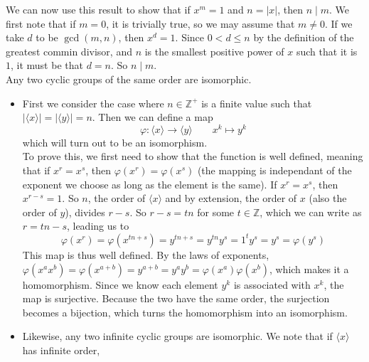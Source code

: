 \documentclass[12pt]{article}
\newcommand{\Z}{\mathbb{Z}}
\newcommand{\ang}[1]{\langle #1 \rangle}
\begin{document}
    We can now use this result to show that
    if $x^m = 1$ and $n = |x|$, then $n \mid m$.
    We first note that if $m = 0$, it is trivially true,
    so we may assume that $m \neq 0$. 
    If we take $d$ to be $\gcd(m, n)$,
    then $x^d = 1$.
    Since $0 < d \leqslant n$
    by the definition of the greatest commin divisor,
    and $n$ is the smallest positive power of $x$ such that it is $1$,
    it must be that $d = n$. So $n \mid m$. \\
    
    Any two cyclic groups of the same order are isomorphic.
    \begin{itemize}[label=$\diamond$]
        \item 
            First we consider the case where
            $n \in \Z^+$ is a finite value
            such that $|\ang{x}| = |\ang{y}| = n$.
            Then we can define a map
            \[ \varphi: \ang{x} \to \ang{y} \qquad x^k \mapsto y^k \]
            which will turn out to be an isomorphism. \\
            To prove this,
            we first need to show that the function is well defined,
            meaning that if $x^r = x^s$,
            then $\varphi(x^r) = \varphi(x^s)$
            (the mapping is independant of the exponent we choose
            as long as the element is the same).
            If $x^r = x^s$, then $x^{r-s} = 1$.
            So $n$, the order of $\ang{x}$ and by extension,
            the order of $x$ (also the order of $y$),
            divides $r - s$.
            So $r-s = tn$ for some $t \in \Z$,
            which we can write as $r = tn - s$,
            leading us to
            \[
                \varphi(x^r) = \varphi(x^{tn + s})
                = y^{tn + s}
                = y^{tn}y^{s}
                = 1^ty^s
                = y^s
                = \varphi(y^s)
            \]
            This map is thus well defined.
            By the laws of exponents,
            $\varphi(x^ax^b) = \varphi(x^{a+b})
            = y^{a+b} = y^ay^b = \varphi(x^a)\varphi(x^b)$,
            which makes it a homomorphism. 
            Since we know each element $y^k$
            is associated with $x^k$,
            the map is surjective.
            Because the two have the same order,
            the surjection becomes a bijection,
            which turns the homomorphism into an isomorphism.
        \item 
            Likewise,
            any two infinite cyclic groups are isomorphic.
            We note that if $\ang{x}$ has infinite order,

\end{itemize}
\end{document}
